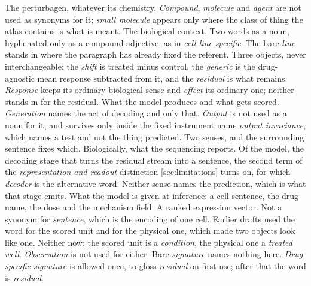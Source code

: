 \begin{description}[leftmargin=1em, itemsep=0.5ex,
                    font=\normalfont\bfseries]
 The perturbagen, whatever its chemistry.
  \emph{Compound}, \emph{molecule} and \emph{agent} are not used as synonyms for
  it; \emph{small molecule} appears only where the class of thing the atlas
  contains is what is meant.
 The biological context. Two words as a noun,
  hyphenated only as a compound adjective, as in \emph{cell-line-specific}. The
  bare \emph{line} stands in where the paragraph has already fixed the referent.
 Three objects, never
  interchangeable: the \emph{shift} is treated minus control, the
  \emph{generic} is the drug-agnostic mean response subtracted from it, and the
  \emph{residual} is what remains. \emph{Response} keeps its ordinary
  biological sense and \emph{effect} its ordinary one; neither stands in for
  the residual.
 What the model produces and what gets scored.
  \emph{Generation} names the act of decoding and only that. \emph{Output} is
  not used as a noun for it, and survives only inside the
  fixed instrument name \emph{output invariance}, which names a test and not
  the thing predicted.
 Two senses, and the surrounding sentence fixes which.
  Biologically, what the sequencing reports. Of the model, the decoding stage
  that turns the residual stream into a sentence, the second term of the
  \emph{representation and readout} distinction \cref{sec:limitations} turns on,
  for which \emph{decoder} is the alternative word. Neither sense names the
  prediction, which is what that stage emits.
 What the model is given at inference: a cell sentence,
  the drug name, the dose and the mechanism field.
 A ranked expression vector. Not a synonym for
  \emph{sentence}, which is the encoding of one cell.
 Earlier drafts used the word for the scored
  unit and for the physical one, which made two objects look like one. Neither
  now: the scored unit is a \emph{condition}, the physical one a \emph{treated
  well}. \emph{Observation} is not used for either.
 Bare \emph{signature} names nothing
  here. \emph{Drug-specific signature} is allowed once, to gloss
  \emph{residual} on first use; after that the word is \emph{residual}.

\end{description}
